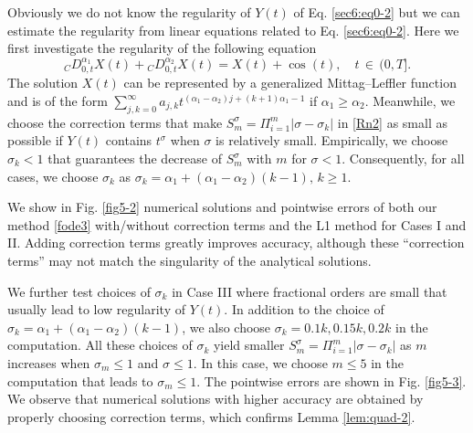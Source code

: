 \documentclass[10pt]{siamltex}
\newcommand{\abs}[1]{\left\vert#1\right\vert}
\begin{document}
Obviously we do not know the regularity of   $Y(t)$ of Eq. \eqref{sec6:eq0-2} but we can   estimate the regularity from  linear  equations related to Eq. \eqref{sec6:eq0-2}. Here we first investigate  the regularity of the  following equation
\begin{equation}\label{sec6:eq0-2=linearized}
{}_{C}D^{\alpha_1}_{0,t}X(t)+{}_{C}D^{\alpha_2}_{0,t}X(t)= X(t) +\cos(t),{\quad}t{\,\in\,}
 (0,T].
\end{equation}
The solution  $X(t)$ can be represented by a generalized Mittag--Leffler function
\cite[Chapter 5.4]{Pod-B99} and   is of the form
 $\sum_{j,k=0}^\infty a_{j,k} t^{(\alpha_1-\alpha_2)j+(k+1)\alpha_1-1}$ if  $\alpha_1\geq \alpha_2$.
Meanwhile, we choose
the  correction terms  that make $S_m^{\sigma} = \Pi_{i=1}^m\abs{\sigma-\sigma_k}$ in \eqref{Rn2}   as small as possible if $Y(t)$ contains $t^{\sigma}$ when $\sigma$ is relatively small.
Empirically, we  choose   $\sigma_k<1$ that guarantees the decrease of     $S_m^{\sigma}$  with $m$ for $\sigma<1$.  Consequently, for all cases, we choose $\sigma_k$ as $\sigma_{k}=\alpha_1+(\alpha_1-\alpha_2)(k-1),\,k\geq 1$.

We show in Fig. \ref{fig5-2} numerical solutions and pointwise errors of both our method \eqref{fode3}   with/without  correction terms and the L1 method for Cases I and II. Adding correction terms  greatly improves accuracy, although these ``correction terms'' may not match the singularity of the analytical solutions.


We further test  choices of  $\sigma_k$ in Case III where fractional orders are small that  usually  lead to low regularity of   $Y(t)$. In addition to the choice of  $\sigma_{k}=\alpha_1+(\alpha_1-\alpha_2)(k-1)$,  we also choose $\sigma_k=0.1k,0.15k,0.2k$ in the computation.  All these choices of $\sigma_k$ yield smaller $S_m^{\sigma} = \Pi_{i=1}^m\abs{\sigma-\sigma_k}$ as $m$ increases when $\sigma_m\leq 1$ and $\sigma\leq 1$. In this case,  we choose $m\leq 5$ in the computation that leads to $\sigma_m\leq 1$.
The pointwise errors are shown in Fig. \ref{fig5-3}. We observe that numerical solutions  with higher accuracy are obtained by properly choosing  correction terms, which  confirms Lemma \ref{lem:quad-2}.
\end{document}
